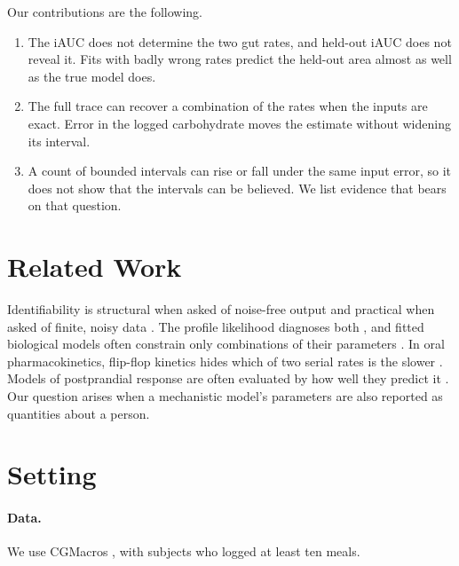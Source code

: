 \documentclass[letterpaper]{article} %
\begin{document}
Our contributions are the following.
\begin{enumerate}
\item The iAUC does not determine the two gut rates, and held-out iAUC does not reveal it. Fits with badly wrong rates predict the held-out area almost as well as the true model does.
\item The full trace can recover a combination of the rates when the inputs are exact. Error in the logged carbohydrate moves the estimate without widening its interval.
\item A count of bounded intervals can rise or fall under the same input error, so it does not show that the intervals can be believed. We list evidence that bears on that question.
\end{enumerate}

\section{Related Work}

Identifiability is structural when asked of noise-free output and practical when asked of finite, noisy data \citep{cobelli1980parameter,miao2011identifiability,wieland2021structural}. The profile likelihood diagnoses both \citep{raue2009structural}, and fitted biological models often constrain only combinations of their parameters \citep{gutenkunst2007universally,eisenberg2014determining}. In oral pharmacokinetics, flip-flop kinetics hides which of two serial rates is the slower \citep{boxenbaum1998flipflop}. Models of postprandial response are often evaluated by how well they predict it \citep{zeevi2015personalized,berry2020human}. Our question arises when a mechanistic model's parameters are also reported as quantities about a person.

\section{Setting}\label{sec:setting}

\paragraph{Data.} We use CGMacros \citep{das2025cgmacros}, with \resCohortCgmSubjects{} subjects who logged at least ten meals.
\end{document}
